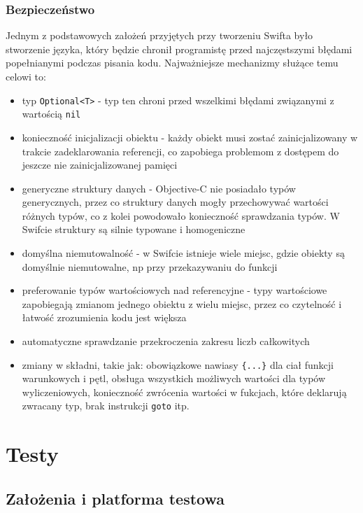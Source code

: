 \documentclass[mgr, shortabstract]{iithesis}
\begin{document}
\subsection{Bezpieczeństwo}

Jednym z podstawowych założeń przyjętych przy tworzeniu Swifta było stworzenie języka, który będzie chronił programistę przed najczęstszymi błędami popełnianymi podczas pisania kodu. Najważniejsze mechanizmy służące temu celowi to:

\begin{itemize}
    \item typ \texttt{Optional<T>} - typ ten chroni przed wszelkimi błędami związanymi z wartością \texttt{nil}
    \item konieczność inicjalizacji obiektu - każdy obiekt musi zostać zainicjalizowany w trakcie zadeklarowania referencji, co zapobiega problemom z dostępem do jeszcze nie zainicjalizowanej pamięci
    \item generyczne struktury danych - Objective-C nie posiadało typów generycznych, przez co struktury danych mogły przechowywać wartości różnych typów, co z kolei powodowało konieczność sprawdzania typów. W Swifcie struktury są silnie typowane i homogeniczne
    \item domyślna niemutowalność - w Swifcie istnieje wiele miejsc, gdzie obiekty są domyślnie niemutowalne, np przy przekazywaniu do funkcji
    \item preferowanie typów wartościowych nad referencyjne - typy wartościowe zapobiegają zmianom jednego obiektu z wielu miejsc, przez co czytelność i łatwość zrozumienia kodu jest większa
    \item automatyczne sprawdzanie przekroczenia zakresu liczb całkowitych
    \item zmiany w składni, takie jak: obowiązkowe nawiasy \texttt{\{...\}} dla ciał funkcji warunkowych i pętl, obsługa wszystkich możliwych wartości dla typów wyliczeniowych, konieczność zwrócenia wartości w fukcjach, które deklarują zwracany typ, brak instrukcji \texttt{goto} itp.
\end{itemize}

\chapter{Testy}
\label{ch:testy}

\section{Założenia i platforma testowa}
\end{document}
